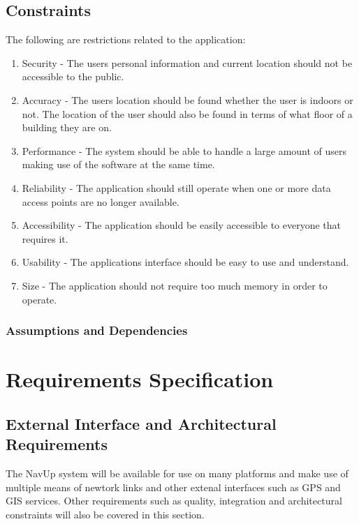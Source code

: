 \documentclass[11pt,a4paper]{article}
\begin{document}
	\subsection{Constraints}
	The following are restrictions related to the application:
		\begin{enumerate}
				\renewcommand{\labelenumi}{{\textbf{\arabic{enumi}.}}}
				\item Security  - The users personal information and current location should not be accessible to the public.
				\item Accuracy - The users location should be found whether the user is indoors or not. The location of the user should also be found in terms of what floor of a building they are on.
				\item Performance - The system should be able to handle a large amount of users making use of the software at the same time.
				\item Reliability - The application should still operate when one or more data access points are no longer available.
				\item Accessibility - The application should be easily accessible to everyone that requires it.
				\item Usability - The applications interface should be easy to use and understand.
				\item Size - The application should not require too much memory in order to operate.
				\end{enumerate}
	\subsubsection{Assumptions and Dependencies}
	
	
\newpage
\section{Requirements Specification}

	\subsection{External Interface and Architectural Requirements}
		
		The NavUp system will be available for use on many platforms and make use of multiple means of newtork links and other extenal interfaces such as GPS and GIS services.
		Other requirements such as quality, integration and architectural constraints will also be covered in this section.
		
\end{document}
